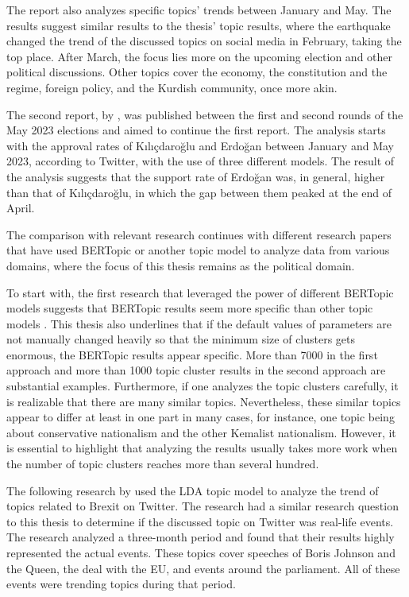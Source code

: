The report also analyzes specific topics' trends between January and May. The results suggest 
similar results to the thesis' topic results, where the earthquake changed the trend of the 
discussed topics on social media in February, taking the top place. After March, the focus lies 
more on the upcoming election and other political discussions. Other topics cover the economy, 
the constitution and the regime, foreign policy, and the Kurdish community, once more akin.

The second report, by \textcite{politusanalytics_2_2023}, was published between the first and 
second rounds of the May 2023 elections and aimed to continue the first report. The analysis 
starts with the approval rates of Kılıçdaroğlu and Erdoğan between January and May 2023, according 
to Twitter, with the use of three different models. The result of the analysis suggests that the 
support rate of Erdoğan was, in general, higher than that of Kılıçdaroğlu, in which the gap between 
them peaked at the end of April.

The comparison with relevant research continues with different research papers that have used BERTopic 
or another topic model to analyze data from various domains, where the focus of this thesis remains 
as the political domain. 

To start with, the first research that leveraged the power of different BERTopic models suggests that 
BERTopic results seem more specific than other topic models 
\parencite{topic_model_comparison_bertopic_2022}. This thesis also underlines that if the default 
values of parameters are not manually changed heavily so that the minimum size of clusters gets 
enormous, the BERTopic results appear specific. More than 7000 in the first approach and more than 
1000 topic cluster results in the second approach are substantial examples. Furthermore, if one 
analyzes the topic clusters carefully, it is realizable that there are many similar topics. 
Nevertheless, these similar topics appear to differ at least in one part in many cases, for instance, 
one topic being about conservative nationalism and the other Kemalist nationalism. However, it is 
essential to highlight that analyzing the results usually takes more work when the number of topic 
clusters reaches more than several hundred.

The following research by \textcite{ilyas_brexit_topic_modeling_2020} used the LDA topic model to 
analyze the trend of topics related to Brexit on Twitter. The research had a similar research question 
to this thesis to determine if the discussed topic on Twitter was real-life events. The research 
analyzed a three-month period and found that their results highly represented the actual events. 
These topics cover speeches of Boris Johnson and the Queen, the deal with the EU, and events around 
the parliament. All of these events were trending topics during that period. 

